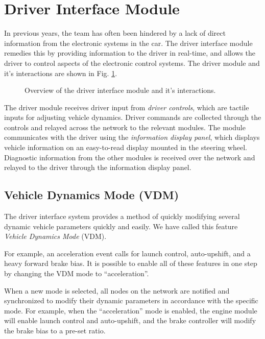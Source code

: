 \section{Driver Interface Module\label{sec:Driver-Interface-Module}}

In previous years, the team has often been hindered by a lack of direct information from the electronic systems in the car. The driver interface module remedies this by providing information to the driver in real-time, and allows the driver to control aspects of the electronic control systems. The driver module and it's interactions are shown in Fig. \ref{fig:design_interface_overview_block}.

\begin{figure}[H]
	\centering
	
	\caption{Overview of the driver interface module and it's interactions.}
	\label{fig:design_interface_overview_block}
\end{figure}

The driver module receives driver input from \emph{driver controls}, which are tactile inputs for adjusting vehicle dynamics. Driver commands are collected through the controls and relayed across the network to the relevant modules. The module communicates with the driver using the \emph{information display panel}, which displays vehicle information on an easy-to-read display mounted in the steering wheel. Diagnostic information from the other modules is received over the network and relayed to the driver through the information display panel. 

\subsection{Vehicle Dynamics Mode (VDM)}

The driver interface system provides a method of quickly modifying several dynamic vehicle parameters quickly and easily. We have called this feature \emph{Vehicle Dynamics Mode} (VDM). 

For example, an acceleration event calls for launch control, auto-upshift, and a heavy forward brake bias. It is possible to enable all of these features in one step by changing the VDM mode to {}``acceleration''. 

When a new mode is selected, all nodes on the network are notified and synchronized to modify their dynamic parameters in accordance with the specific mode. For example, when the  {}``acceleration'' mode is enabled, the engine module will enable launch control and auto-upshift, and the brake controller will modify the brake bias to a pre-set ratio.

